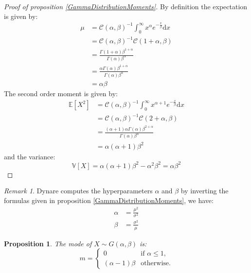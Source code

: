 \documentclass{amsart}
\theoremstyle{plain}
\newtheorem{proposition}{Proposition}[section]
\theoremstyle{remark}
\newtheorem{remark}{Remark}[section]
\numberwithin{equation}{section}
\begin{document}
 \begin{proof}[Proof of proposition \ref{GammaDistributionMoments}]
   By definition the expectation is given by:
   \[
     \begin{split}
       \mu &= \mathcal C(\alpha,\beta)^{-1}\int_{0}^{\infty}x^{\alpha}e^{-\frac{x}{\beta}}\mathrm d x \\
       &= \mathcal C(\alpha,\beta)^{-1}\mathcal C(1+\alpha,\beta) \\
       &= \frac{\Gamma(1+\alpha)\beta^{1+\alpha}}{\Gamma(\alpha)\beta^{\alpha}} \\
       &= \frac{\alpha\Gamma(\alpha)\beta^{1+\alpha}}{\Gamma(\alpha)\beta^{\alpha}} \\
       &= \alpha\beta
     \end{split}
   \]
   The second order moment is given by:
   \[
     \begin{split}
       \mathbb E [X^2] &= \mathcal C(\alpha,\beta)^{-1}\int_{0}^{\infty}x^{\alpha+1}e^{-\frac{x}{\beta}}\mathrm d x \\
       &= \mathcal C(\alpha,\beta)^{-1}\mathcal C(2+\alpha,\beta) \\
       &= \frac{(\alpha+1)\alpha\Gamma(\alpha)\beta^{2+\alpha}}{\Gamma(\alpha)\beta^{\alpha}} \\
       &= \alpha(\alpha+1)\beta^2
     \end{split}
   \]
   and the variance:
   \[
     \mathbb V[X] = \alpha(\alpha+1)\beta^2 - \alpha^2\beta^2 = \alpha\beta^2
   \]
 \end{proof}

 \begin{remark}
   Dynare computes the hyperparameters $\alpha$ and $\beta$ by
   inverting the formulas given in proposition
   \ref{GammaDistributionMoments}, we have:
   \[
     \begin{split}
       \alpha &= \frac{\mu^2}{\sigma^2} \\
       \beta &= \frac{\sigma^2}{\mu}
     \end{split}
   \]
 \end{remark}

 \begin{proposition}
   \label{GammaDistributionMode}
   The mode of $X\sim G(\alpha, \beta)$ is:
   \[
     m =
     \begin{cases}
       0 &\text{if } \alpha\leq 1\text{,} \\
       (\alpha-1)\beta &\text{otherwise.}
     \end{cases}
   \]
 \end{proposition}
\end{document}
